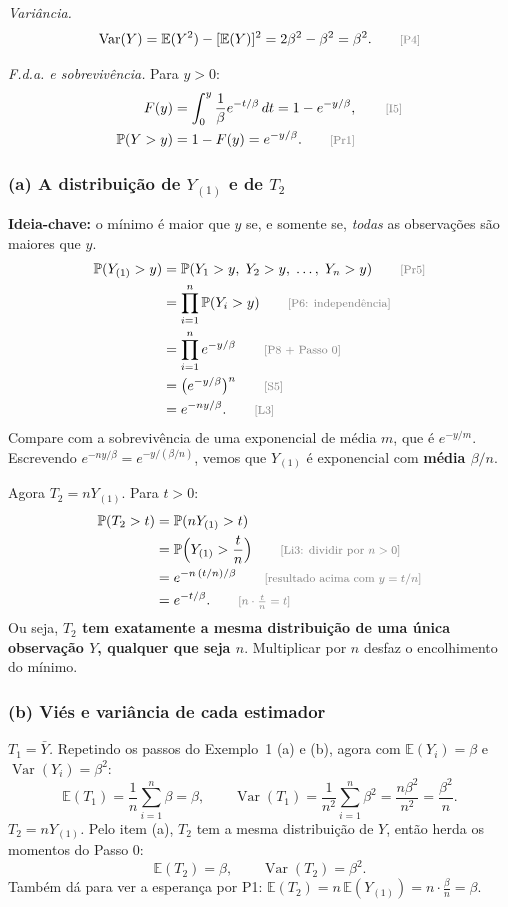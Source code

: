 \documentclass[11pt,a4paper]{article}
\theoremstyle{definition}
\theoremstyle{plain}
\newcommand{\E}{\mathbb{E}}
\newcommand{\Var}{\operatorname{Var}}
\newcommand{\Prob}{\mathbb{P}}
\newcommand{\bY}{\bar{Y}}
\newcommand{\just}[1]{\tag*{\footnotesize\textcolor{gray}{[#1]}}}
\begin{document}
\textit{Variância.}
\[
\Var(Y)=\E(Y^2)-[\E(Y)]^2=2\beta^2-\beta^2=\beta^2 . \just{P4}
\]

\textit{F.d.a. e sobrevivência.} Para $y>0$:
\begin{align*}
F(y)&=\int_0^y\frac1\beta e^{-t/\beta}\,dt=1-e^{-y/\beta}, \just{I5}\\
\Prob(Y>y)&=1-F(y)=e^{-y/\beta}. \just{Pr1}
\end{align*}

\subsubsection*{(a) A distribuição de $Y_{(1)}$ e de $T_2$}
\textbf{Ideia-chave:} o mínimo é maior que $y$ se, e somente se, \emph{todas} as observações são maiores que $y$.
\begin{align*}
\Prob(Y_{(1)}>y)&=\Prob(Y_1>y,\;Y_2>y,\;\dots,\;Y_n>y) \just{Pr5}\\
&=\prod_{i=1}^n\Prob(Y_i>y) \just{P6: independência}\\
&=\prod_{i=1}^n e^{-y/\beta} \just{P8 + Passo 0}\\
&=\big(e^{-y/\beta}\big)^n \just{S5}\\
&=e^{-ny/\beta}. \just{L3}
\end{align*}
Compare com a sobrevivência de uma exponencial de média $m$, que é $e^{-y/m}$. Escrevendo $e^{-ny/\beta}=e^{-y/(\beta/n)}$, vemos que $Y_{(1)}$ é exponencial com \textbf{média $\beta/n$}.

Agora $T_2=nY_{(1)}$. Para $t>0$:
\begin{align*}
\Prob(T_2>t)&=\Prob(nY_{(1)}>t)\\
&=\Prob\Big(Y_{(1)}>\frac tn\Big) \just{Li3: dividir por $n>0$}\\
&=e^{-n\,(t/n)/\beta} \just{resultado acima com $y=t/n$}\\
&=e^{-t/\beta}. \just{$n\cdot\frac tn=t$}
\end{align*}
Ou seja, \textbf{$T_2$ tem exatamente a mesma distribuição de uma única observação $Y$, qualquer que seja $n$}. Multiplicar por $n$ desfaz o encolhimento do mínimo.

\subsubsection*{(b) Viés e variância de cada estimador}
\textit{$T_1=\bY$.} Repetindo os passos do Exemplo~1 (a) e (b), agora com $\E(Y_i)=\beta$ e $\Var(Y_i)=\beta^2$:
\[
\E(T_1)=\frac1n\sum_{i=1}^n\beta=\beta,
\qquad
\Var(T_1)=\frac1{n^2}\sum_{i=1}^n\beta^2=\frac{n\beta^2}{n^2}=\frac{\beta^2}{n}.
\]
\textit{$T_2=nY_{(1)}$.} Pelo item (a), $T_2$ tem a mesma distribuição de $Y$, então herda os momentos do Passo 0:
\[
\E(T_2)=\beta,\qquad\Var(T_2)=\beta^2 .
\]
Também dá para ver a esperança por P1: $\E(T_2)=n\,\E(Y_{(1)})=n\cdot\frac{\beta}{n}=\beta$.
\end{document}
